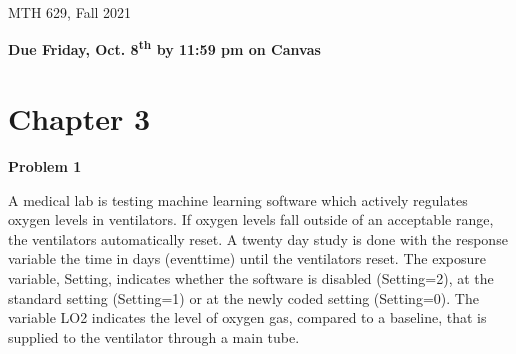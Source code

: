 \documentclass[12pt]{article}
\begin{document}
{
            \hfill {MTH 629, Fall 2021}}
\bigskip

{\bf Due Friday, Oct. 8\textsuperscript{th} by 11:59 pm on Canvas}

\section{Chapter 3}
\textbf{Problem 1}
\vspace{5pt} 

A medical lab is testing machine learning software which actively regulates oxygen levels in ventilators. If oxygen levels fall outside of an acceptable range, the ventilators automatically reset. A twenty day study is done with the response variable the time in days (eventtime) until the ventilators reset. The exposure variable, Setting, indicates whether the software is disabled (Setting=2), at the standard setting (Setting=1) or at the newly coded setting (Setting=0). The variable LO2 indicates the level of oxygen gas, compared to a baseline, that is supplied to the ventilator through a main tube.
\end{document}

